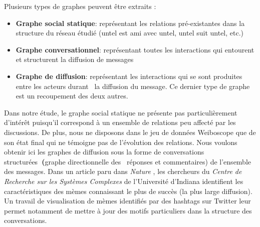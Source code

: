 Plusieurs types de graphes peuvent \^etre extraits :

\begin{itemize}
\item \textbf{Graphe social statique}: représentant les relations pré-existantes dans la structure du réseau étudié (untel est ami avec untel, untel suit untel, etc.)
\item \textbf{Graphe conversationnel}: représentant toutes les interactions qui entourent et structurent la diffusion de messages 
\item \textbf{Graphe de diffusion}: représentant les interactions qui se sont produites entre les acteurs durant \ la diffusion du message. Ce dernier type de graphe est un recoupement des deux autres.
\end{itemize}


Dans notre étude, le graphe social statique ne présente pas particulièrement d{\textquoteright}intér\^et puisqu{\textquoteright}il correspond à un ensemble de relations peu affecté par les discussions. De plus, nous ne disposons dans le jeu de données Weiboscope que de son état final qui ne témoigne pas de l{\textquoteright}évolution des relations. Nous voulons obtenir ici les graphes de diffusion sous la forme de conversations structurées\textbf{~(}graphe directionnelle des \ réponses et commentaires) de l{\textquoteright}ensemble des messages. Dans un article paru dans \textit{Nature} \citep{Weng2012}, les chercheurs du \textit{Centre de Recherche sur les Systèmes Complexes} de l{\textquoteright}Université d{\textquoteright}Indiana identifient les caractéristiques des mèmes connaissant le plus de succès (la plus large diffusion). Un travail de visualisation de mèmes identifiés par des hashtags sur Twitter leur permet notamment de mettre à jour des motifs particuliers dans la structure des conversations.


